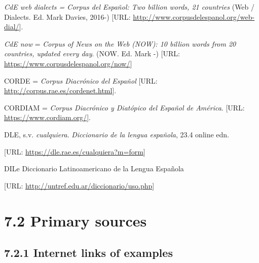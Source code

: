 \textit{CdE web dialects = Corpus del Español: Two billion words, 21 countries} (Web / Dialects. Ed. Mark Davies, 2016-) [URL: \url{http://www.corpusdelespanol.org/web-dial/}].

\textit{CdE now} = \textit{Corpus of News on the Web (NOW): 10 billion words from 20 countries, updated every day}. (NOW. Ed. Mark \citealt{Davies2016}-) [URL: \url{https://www.corpusdelespanol.org/now/}]

CORDE = \textit{Corpus Diacrónico del Español} [URL: \url{http://corpus.rae.es/cordenet.html}]. 

CORDIAM = \textit{Corpus Diacrónico y Diatópico del Español de América}. [URL: \url{https://www.cordiam.org/}].

DLE, s.v. \textit{cualquiera}. \textit{Diccionario de la lengua española}, 23.4 online edn. 

  [URL: \url{https://dle.rae.es/cualquiera?m=form}{]}

DILe Diccionario Latinoamericano de la Lengua Española 

  [URL: \url{http://untref.edu.ar/diccionario/uso.php}]

\section{7.2 Primary sources}
\subsection{7.2.1 Internet links of examples}


